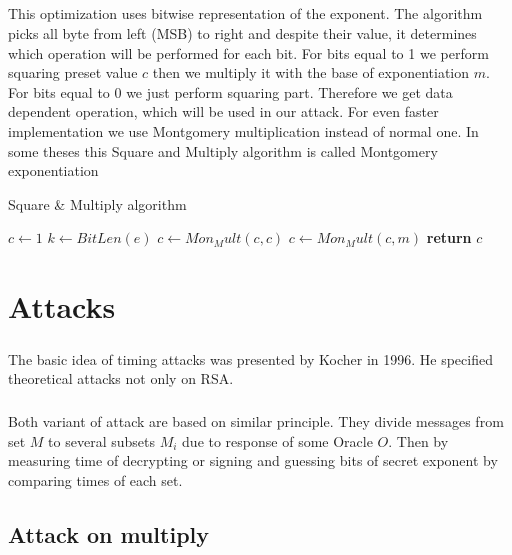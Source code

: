 \documentclass[thesis=B,english]{FITthesis}[2012/10/20]
\begin{document}
{\paragraph*{}
{This optimization uses bitwise representation of the exponent. The algorithm picks all byte from left (MSB) to right and despite their value, 
it determines which operation will be performed for each bit. For bits equal to 1 we perform squaring preset value \(c\) then we multiply it with the base of exponentiation \(m\). 
For bits equal to 0 we just perform squaring part. Therefore we get data dependent operation, which will be used in our attack. For even faster implementation we use Montgomery
multiplication instead of normal one. In some theses this Square and Multiply algorithm is called Montgomery exponentiation}



\begin{algorithm}[H]
\caption{Square \& Multiply algorithm}
\begin{algorithmic}[1]
 \State $c\gets 1$
 \State $k\gets BitLen(e)$
  \State $c \gets Mon_Mult(c,c)$
   \State $c \gets Mon_Mult(c,m)$
  \EndIf
 \EndFor
\State \textbf{return} $c$
\EndFunction
 
\end{algorithmic}
\end{algorithm}



\chapter{Attacks}
\paragraph*{}{
The basic idea of timing attacks was presented by Kocher in 1996. He specified theoretical attacks not only on RSA.
}

\paragraph*{}{
Both variant of attack are based on similar principle. They divide messages from set \(M\) to several subsets \(M_i\) due to response of some Oracle \(O\). Then by measuring time of decrypting or signing and 
guessing bits of secret exponent by comparing times of each set.
}
\section{Attack on multiply}
}
\end{document}
